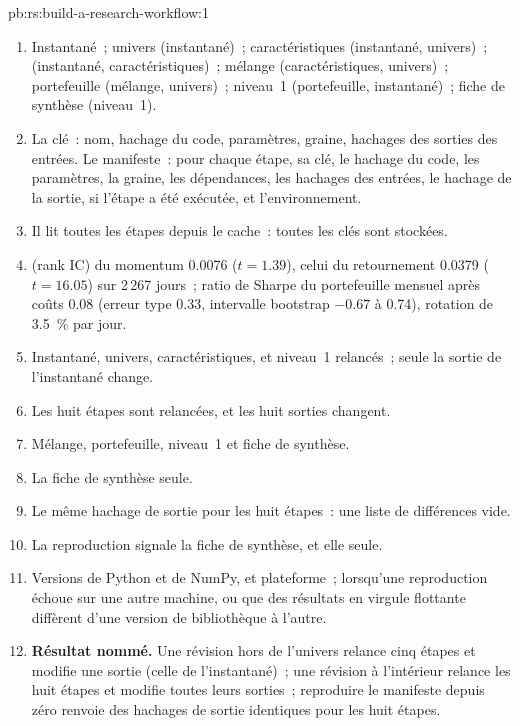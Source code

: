 \begin{solution}{pb:rs:build-a-research-workflow:1}
\begin{enumerate}
\item Instantané~; univers (instantané)~; caractéristiques (instantané, univers)~;  (instantané, caractéristiques)~; mélange (caractéristiques, univers)~; portefeuille (mélange, univers)~; niveau~1
(portefeuille, instantané)~; fiche de synthèse (niveau~1).
\item La clé~: nom, hachage du code, paramètres, graine, hachages des sorties des entrées. Le manifeste~: pour chaque étape, sa clé, le hachage du code, les paramètres,
la graine, les dépendances, les hachages des entrées, le hachage de la sortie, si l'étape a été exécutée, et l'environnement.
\item Il lit toutes les étapes depuis le cache~: toutes les clés sont stockées.
\item {} (rank IC) du momentum 0.0076 ($t = 1.39$), celui du retournement 0.0379 ($t = 16.05$) sur 2\,267 jours~; ratio de Sharpe du portefeuille mensuel après coûts 0.08 (erreur type
0.33, intervalle bootstrap $-0.67$ à 0.74), rotation de 3.5~\% par jour.
\item Instantané, univers, caractéristiques,  et niveau~1 relancés~; seule la sortie de l'instantané change.
\item Les huit étapes sont relancées, et les huit sorties changent.
\item Mélange, portefeuille, niveau~1 et fiche de synthèse.
\item La fiche de synthèse seule.
\item Le même hachage de sortie pour les huit étapes~: une liste de différences vide.
\item La reproduction signale la fiche de synthèse, et elle seule.
\item Versions de Python et de NumPy, et plateforme~; lorsqu'une reproduction échoue sur une autre machine, ou que des résultats en virgule flottante diffèrent d'une version de bibliothèque à l'autre.
\item \textbf{Résultat nommé.} Une révision hors de l'univers relance cinq étapes et modifie une sortie (celle de l'instantané)~; une révision à l'intérieur relance les huit étapes et modifie toutes leurs
sorties~; reproduire le manifeste depuis zéro renvoie des hachages de sortie identiques pour les huit étapes.

\end{enumerate}
\end{solution}

